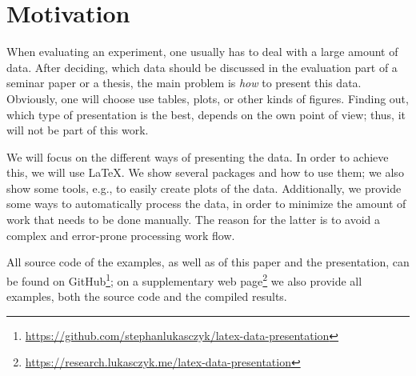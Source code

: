 \section{Motivation}

When evaluating an experiment, one usually has to deal with a large amount of
data.  After deciding, which data should be discussed in the evaluation part of
a seminar paper or a thesis, the main problem is \emph{how} to present this
data. Obviously, one will choose use tables, plots, or other kinds of figures.
Finding out, which type of presentation is the best, depends on the own point of
view; thus, it will not be part of this work.

We will focus on the different ways of presenting the data.  In order to achieve
this, we will use \LaTeX\@.  We show several packages and how to use them; we
also show some tools, e.g., to easily create plots of the data.  Additionally,
we provide some ways to automatically process the data, in order to minimize the
amount of work that needs to be done manually.  The reason for the latter is to
avoid a complex and error-prone processing work flow.

All source code of the examples, as well as of this paper and the presentation,
can be found on GitHub\footnote{%
  \href{https://github.com/stephanlukasczyk/latex-data-presentation}%
    {https://github.com/stephanlukasczyk/latex-data-presentation}}; on a
supplementary web page\footnote{%
  \href{https://research.lukasczyk.me/latex-data-presentation}%
    {https://research.lukasczyk.me/latex-data-presentation}} we also provide all
examples, both the source code and the compiled results.
